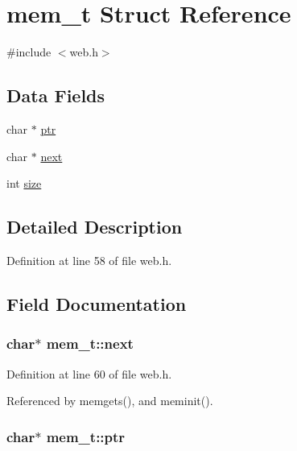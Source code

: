 \hypertarget{structmem__t}{\section{mem\-\_\-t Struct Reference}
\label{structmem__t}
}


{\ttfamily \#include $<$web.\-h$>$}

\subsection*{Data Fields}
\begin{DoxyCompactItemize}
\item 
char $\ast$ \hyperlink{structmem__t_af9fd184846ee12236e952731fa592a74}{ptr}
\item 
char $\ast$ \hyperlink{structmem__t_a57b0ca2400c977d234c77e9d20a03c46}{next}
\item 
int \hyperlink{structmem__t_ab04d46fb2982c9a26a26244286c1b33b}{size}
\end{DoxyCompactItemize}


\subsection{Detailed Description}


Definition at line 58 of file web.\-h.



\subsection{Field Documentation}
\hypertarget{structmem__t_a57b0ca2400c977d234c77e9d20a03c46}{
\subsubsection[{next}]{\setlength{\rightskip}{0pt plus 5cm}char$\ast$ mem\-\_\-t\-::next}}\label{structmem__t_a57b0ca2400c977d234c77e9d20a03c46}


Definition at line 60 of file web.\-h.



Referenced by memgets(), and meminit().

\hypertarget{structmem__t_af9fd184846ee12236e952731fa592a74}{
\subsubsection[{ptr}]{\setlength{\rightskip}{0pt plus 5cm}char$\ast$ mem\-\_\-t\-::ptr}}\label{structmem__t_af9fd184846ee12236e952731fa592a74}


